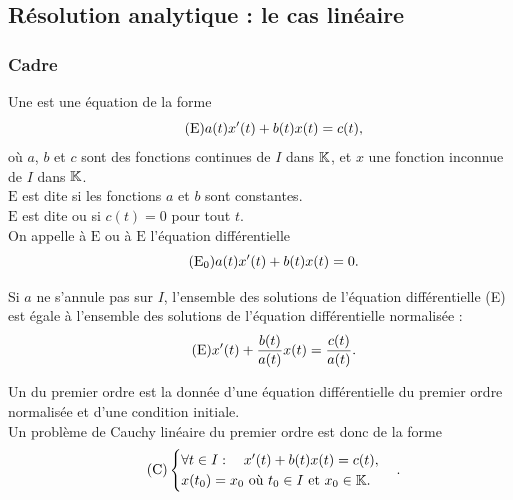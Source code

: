 \documentclass{book}
\begin{document}
\subsection{Résolution analytique : le cas linéaire}
\subsubsection{Cadre}
\begin{Definition}
Une 
est une équation de la forme
\[\tag{$\mathrm{E}$} a(t) x'(t) + b(t) x(t) = c(t),\]
où $a$, $b$ et $c$ sont des fonctions continues de $I$ dans $\mathbb{K}     $,
et $x$ une fonction inconnue de $I$ dans $\mathbb{K}$.\\
$\mathrm{E}$ est dite 
  si les fonctions $a$ et $b$ sont constantes.\\
$\mathrm{E}$ est dite  ou 
  si  $  c(t) = 0$ pour tout $t$.\\
On appelle  à $\mathrm{E}$
  ou  à $\mathrm{E}$
  l'équation différentielle
 \[\tag{$\mathrm{E_0}$} a(t) x'(t) + b(t) x(t) = 0.\]
\end{Definition}
\begin{Remarque}
Si $a$ ne s'annule pas sur $I$, l'ensemble des solutions de l'équation différentielle (E) est égale à l'ensemble des solutions de l'équation différentielle normalisée :
\[\tag{$\mathrm{E}$}  x'(t) + \frac{b(t)}{a(t)} x(t) = \frac{c(t)}{a(t)}.\]
\end{Remarque}

\begin{Definition}
Un  du premier ordre
est la donnée d'une équation différentielle du premier ordre
normalisée et d'une condition initiale.\\
Un problème de Cauchy linéaire du premier ordre est donc de la forme
\[\tag{$\mathrm{C}$} \begin{cases}
    \forall t\in I:\quad x'(t) + b(t)x(t) = c(t), \\
    x(t_0) = x_0 \text{ où } t_0\in I \text{ et } x_0\in \K     .
\end{cases}.\]
\end{Definition}
\end{document}
